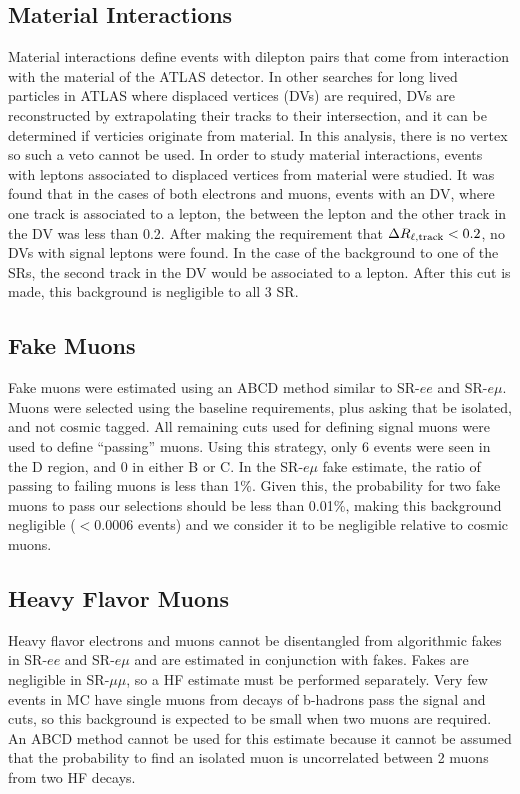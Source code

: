\subsection{Material Interactions}

Material interactions define events with dilepton pairs that come from interaction with the material of the \ac{ATLAS} detector. In other searches for long lived particles in \ac{ATLAS} where displaced vertices (\acp{DV}) are required, \ac{DV}s are reconstructed by extrapolating their tracks to their intersection, and it can be determined if verticies originate from material. In this analysis, there is no vertex so such a veto cannot be used. In order to study material interactions, events with leptons associated to displaced vertices from material were studied. It was found that in the cases of both electrons and muons, events with an \ac{DV}, where one track is associated to a lepton, the \dR between the lepton and the other track in the \ac{DV} was less than 0.2. After making the requirement that $\Delta R_{\ell, \text{track}} < 0.2$, no \acp{DV} with signal leptons were found. In the case of the background to one of the \acp{SR}, the second track in the \ac{DV} would be associated to a lepton. After this cut is made, this background is negligible to all 3 \ac{SR}.

\subsection{Fake Muons}
Fake muons were estimated using an ABCD method similar to SR-$ee$ and SR-$e\mu$. Muons were selected using the baseline requirements, plus asking that be isolated, and not cosmic tagged. All remaining cuts used for defining signal muons were used to define ``passing'' muons. Using this strategy, only 6 events were seen in the D region, and 0 in either B or C. In the SR-$e\mu$ fake estimate, the ratio of passing to failing muons is less than 1\%. Given this, the probability for two fake muons to pass our selections should be less than 0.01\%, making this background negligible ($<0.0006$ events) and we consider it to be negligible relative to cosmic muons.

\subsection{Heavy Flavor Muons}

Heavy flavor electrons and muons cannot be disentangled from algorithmic fakes in SR-$ee$ and SR-$e\mu$ and are estimated in conjunction with fakes. Fakes are negligible in SR-$\mu\mu$, so a \ac{HF} estimate must be performed separately. Very few events in \ttbar \ac{MC} have single muons from decays of b-hadrons pass the signal \pt and \absdz cuts, so this background is expected to be small when two muons are required. An ABCD method cannot be used for this estimate because it cannot be assumed that the probability to find an isolated muon is uncorrelated between 2 muons from two \ac{HF} decays.

